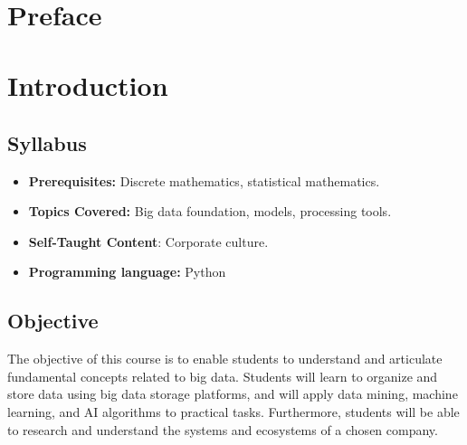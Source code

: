 

\newcommand{\tab}{\hspace{\parindent}}

\begin{titlepage}
\bordertitle
\begin{center}
\vspace{\fill} \maintitle \\ \vspace{\fill} \bottitle
\end{center}
\end{titlepage}
\newpage
{}
\tableofcontents
\thispagestyle{empty}
\newpage
\chapter*{ Preface }
\thispagestyle{empty}
\vspace{\fill}

\vspace{\fill}
\newpage
\setcounter{page}{1}
\chapter{ Introduction }
\section{ Syllabus }
\begin{itemize}
    \item\textbf{Prerequisites:} Discrete mathematics, statistical mathematics.
    \item \textbf{Topics Covered:} Big data foundation, models, processing
        tools.
    \item \textbf{Self-Taught Content}: Corporate culture.
    \item \textbf{Programming language:} Python
\end{itemize}
\section{ Objective }
    The objective of this course is to enable students to understand and 
    articulate fundamental concepts related to big data. Students will learn to 
    organize and store data using big data storage platforms, and will apply 
    data mining, machine learning, and AI algorithms to practical tasks. 
    Furthermore, students will be able to research and understand the systems 
    and ecosystems of a chosen company.
